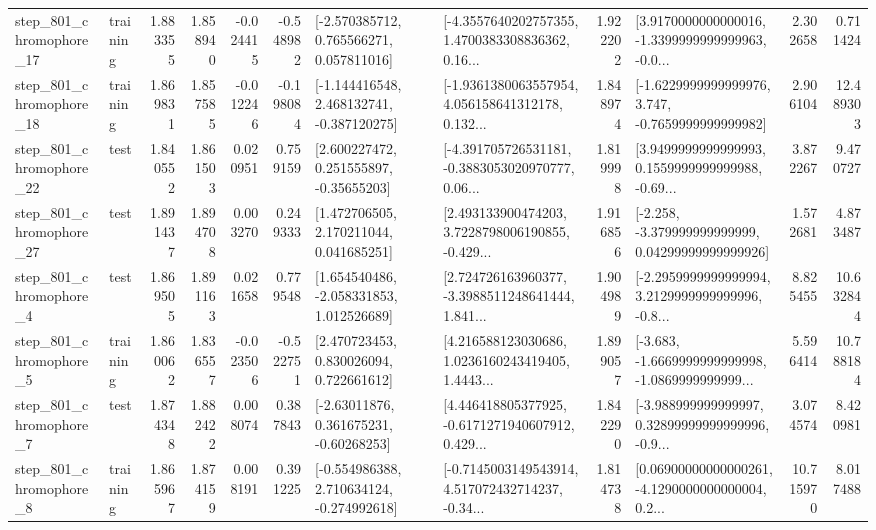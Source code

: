 \begin{tabular}{llrrrrllrlrr}
  step\_801\_chromophore\_17 &  training &      1.883355 &    1.858940 &     -0.024415 & -0.548982 &    [-2.570385712, 0.765566271, 0.057811016] &  [-4.3557640202757355, 1.4700383308836362, 0.16... &       1.922202 &  [3.9170000000000016, -1.3399999999999963, -0.0... &            2.302658 &          0.711424 \\
  step\_801\_chromophore\_18 &  training &      1.869831 &    1.857585 &     -0.012246 & -0.198084 &   [-1.144416548, 2.468132741, -0.387120275] &  [-1.9361380063557954, 4.056158641312178, 0.132... &       1.848974 &  [-1.6229999999999976, 3.747, -0.7659999999999982] &            2.906104 &         12.489303 \\
  step\_801\_chromophore\_22 &      test &      1.840552 &    1.861503 &      0.020951 &  0.759159 &     [2.600227472, 0.251555897, -0.35655203] &  [-4.391705726531181, -0.3883053020970777, 0.06... &       1.819998 &  [3.9499999999999993, 0.1559999999999988, -0.69... &            3.872267 &          9.470727 \\
  step\_801\_chromophore\_27 &      test &      1.891437 &    1.894708 &      0.003270 &  0.249333 &     [1.472706505, 2.170211044, 0.041685251] &  [2.493133900474203, 3.7228798006190855, -0.429... &       1.916856 &  [-2.258, -3.379999999999999, 0.04299999999999926] &            1.572681 &          4.873487 \\
   step\_801\_chromophore\_4 &      test &      1.869505 &    1.891163 &      0.021658 &  0.779548 &    [1.654540486, -2.058331853, 1.012526689] &  [2.724726163960377, -3.3988511248641444, 1.841... &       1.904989 &  [-2.2959999999999994, 3.2129999999999996, -0.8... &            8.825455 &         10.632844 \\
   step\_801\_chromophore\_5 &  training &      1.860062 &    1.836557 &     -0.023506 & -0.522751 &     [2.470723453, 0.830026094, 0.722661612] &  [4.216588123030686, 1.0236160243419405, 1.4443... &       1.899057 &  [-3.683, -1.6669999999999998, -1.0869999999999... &            5.596414 &         10.788184 \\
   step\_801\_chromophore\_7 &      test &      1.874348 &    1.882422 &      0.008074 &  0.387843 &     [-2.63011876, 0.361675231, -0.60268253] &  [4.446418805377925, -0.6171271940607912, 0.429... &       1.842290 &  [-3.988999999999997, 0.32899999999999996, -0.9... &            3.074574 &          8.420981 \\
   step\_801\_chromophore\_8 &  training &      1.865967 &    1.874159 &      0.008191 &  0.391225 &   [-0.554986388, 2.710634124, -0.274992618] &  [-0.7145003149543914, 4.517072432714237, -0.34... &       1.814738 &  [0.06900000000000261, -4.1290000000000004, 0.2... &           10.715970 &          8.017488 \\

\end{tabular}
